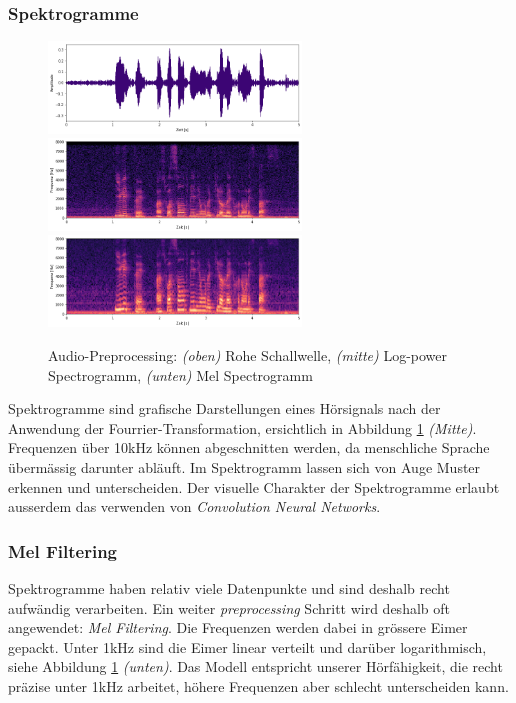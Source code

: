 \subsubsection{Spektrogramme}
\begin{figure}[hbt]
	\centering
		\includegraphics[width=0.6\textwidth]{assets/audio_raw.png}
		\includegraphics[width=0.6\textwidth]{assets/audio_log.png}
		\includegraphics[width=0.6\textwidth]{assets/audio_mel.png}
	\centering
	\caption{Audio-Preprocessing: \textit{(oben)} Rohe Schallwelle, \textit{(mitte)}
		     Log-power Spectrogramm, 
		     \textit{(unten)} Mel Spectrogramm}
	\label{img:preprocessing}
\end{figure}
Spektrogramme sind grafische Darstellungen eines Hörsignals nach der Anwendung der Fourrier-Transformation\parencite[]['Spectrograms']{fourrier}, ersichtlich in Abbildung \ref{img:preprocessing} \textit{(Mitte)}. Frequenzen über 10kHz können abgeschnitten werden, da menschliche Sprache übermässig darunter abläuft\parencite{tenkHz}. Im Spektrogramm lassen sich von Auge Muster erkennen und unterscheiden. Der visuelle Charakter der Spektrogramme erlaubt ausserdem das verwenden von \textit{Convolution Neural Networks}.

\subsubsection{Mel Filtering}

Spektrogramme haben relativ viele Datenpunkte und sind deshalb recht aufwändig verarbeiten. Ein weiter \textit{preprocessing} Schritt wird deshalb oft angewendet: \textit{Mel Filtering}\parencite{mel}. Die Frequenzen werden dabei in grössere Eimer gepackt. Unter 1kHz sind die Eimer linear verteilt und darüber logarithmisch, siehe Abbildung \ref{img:preprocessing} \textit{(unten)}. Das Modell entspricht unserer Hörfähigkeit, die recht präzise unter 1kHz arbeitet, höhere Frequenzen aber schlecht unterscheiden kann\parencite{tenkHz}. 

